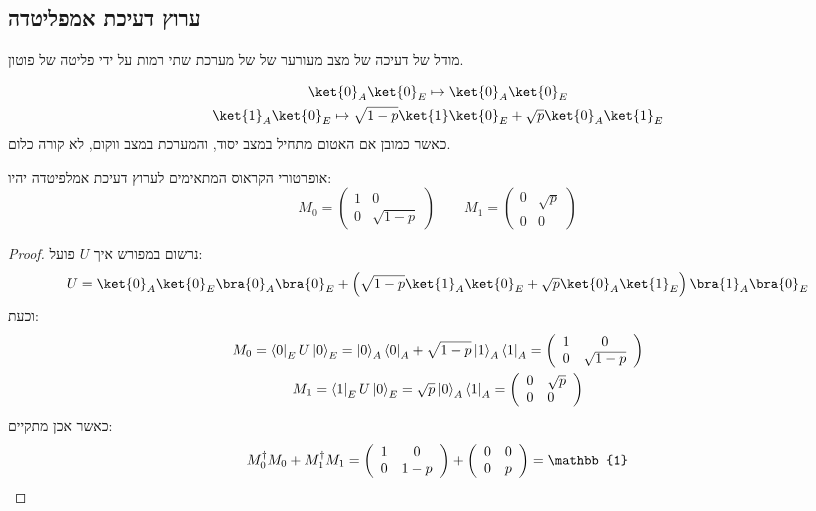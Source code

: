\documentclass{tstextbook}
\begin{document}
\subsection{ערוץ דעיכת אמפליטדה}

\begin{definition}
מודל של דעיכה של מצב מעורער של של מערכת שתי רמות על ידי פליטה של פוטון.

\end{definition}
\begin{proposition}
$$\begin{gather}\ket{0} _{A}\ket{0} _{E}\mapsto \ket{0} _{A}\ket{0} _{E}  \\\ket{1} _{A}\ket{0} _{E}\mapsto \sqrt{ 1-p }\ket{1} \ket{0} _{E}+\sqrt{ p }\ket{0} _{A}\ket{1} _{E}
\end{gather}$$
כאשר כמובן אם האטום מתחיל במצב יסוד, והמערכת במצב ווקום, לא קורה כלום.

\end{proposition}
\begin{proposition}
אופרטורי הקראוס המתאימים לערוץ דעיכת אמלפיטדה יהיו:
$$M_{0}=\begin{pmatrix}1 & 0 \\0 & \sqrt{ 1-p }\end{pmatrix}\qquad M_{1}=\begin{pmatrix}0 & \sqrt{ p } \\0 & 0
\end{pmatrix}$$

\end{proposition}
\begin{proof}
נרשום במפורש איך \(U\) פועל:
$$U=\ket{0} _{A}\ket{0} _{E}\bra{0} _{A}\bra{0} _{E}+\left( \sqrt{ 1-p }\ket{1}_{A} \ket{0} _{E}+\sqrt{ p }\ket{0} _{A}\ket{1} _{E} \right)\bra{1} _{A}\bra{0} _{E}$$
וכעת:
$$\begin{gather}M_{0}=\left\langle0\right|_{E}U\left|0\right\rangle_{E}=\left|0\right\rangle_{A}\left\langle0\right|_{A}+\sqrt{1-p}\left|1\right\rangle_{A}\left\langle1\right|_{A}=\left(\begin{array}{c c}{{1}}&{{0}}\\ {{0}}&{{\sqrt{1-p}}}\end{array}\right)\\ M_{1}=\left\langle1\right|_{E}U\left|0\right\rangle_{E}=\sqrt{p}\left|0\right\rangle_{A}\left\langle1\right|_{A}=\left(\begin{array}{l l}{{0}}&{{\sqrt{p}}}\\ {{0}}&{{0}}\end{array}\right) 
\end{gather}$$
כאשר אכן מתקיים:
$${ M}_{0}^{\dagger}{ M}_{0}+{ M}_{1}^{\dagger}{ M}_{1}=\left(\begin{array}{c c}{{1}}&{{0}}\\ {{0}}&{{1-p}}\end{array}\right)+\left(\begin{array}{c c}{{0}}&{{0}}\\ {{0}}&{{p}}\end{array}\right)=\mathbb{1} $$

\end{proof}
\end{document}
